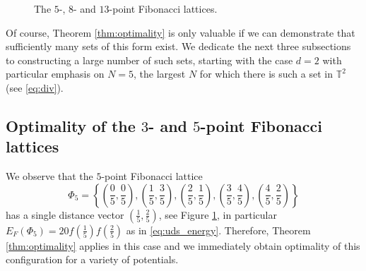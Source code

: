 \documentclass[a4paper,12pt]{article}
\numberwithin{equation}{section}
\theoremstyle{definition}
\begin{document}
\begin{figure}[htp]
\caption{The $5$-, $8$- and $13$-point Fibonacci lattices.}
\label{fig:fib_lats}
\end{figure}

Of course, Theorem \ref{thm:optimality} is only valuable if we can demonstrate that sufficiently many sets of this form exist. We dedicate the next three subsections to constructing a large number of such sets, starting with the case $d=2$ with particular emphasis on $N=5$, the largest $N$ for which there is such a set in $\mathbb{T}^2$ (see \eqref{eq:div}).  

\subsection{Optimality of the $3$- and $5$-point Fibonacci lattices}

We observe that the 
$5$-point Fibonacci lattice
$$
\Phi_5 = \left\{\left(\frac05, \frac05\right), \left(\frac15, \frac35\right), \left(\frac25, \frac15\right), \left(\frac35, \frac45\right), \left(\frac45, \frac25\right)\right\}
$$
has a single distance vector $\left(\frac15, \frac25 \right)$, see Figure \ref{fig:fib_lats}, in particular $
E_F(\Phi_5) = 20 f\left(\frac15\right) f\left(\frac25\right)
$
as in \eqref{eq:uds_energy}. Therefore, Theorem \ref{thm:optimality} applies in this case and we immediately obtain optimality of this configuration for a variety of potentials.

\end{document}
